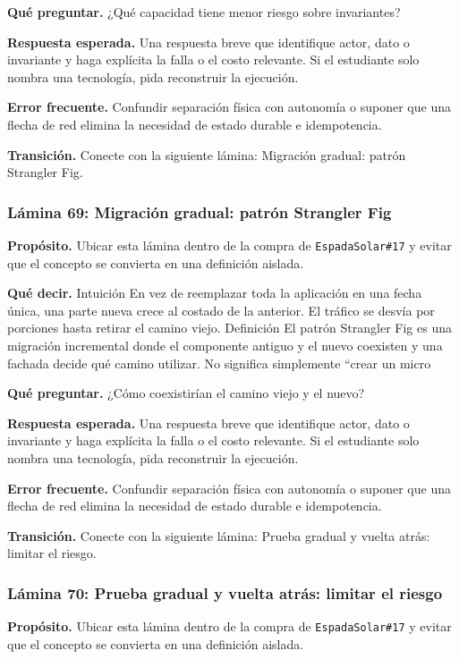 \documentclass[variant=docente,cover=institutional,mode=screen]{ua-engineering-v6-article}
\begin{document}
\textbf{Qué preguntar.} ¿Qué capacidad tiene menor riesgo sobre invariantes?

\textbf{Respuesta esperada.} Una respuesta breve que identifique actor, dato o invariante y haga explícita la falla o el costo relevante. Si el estudiante solo nombra una tecnología, pida reconstruir la ejecución.

\textbf{Error frecuente.} Confundir separación física con autonomía o suponer que una flecha de red elimina la necesidad de estado durable e idempotencia.

\textbf{Transición.} Conecte con la siguiente lámina: Migración gradual: patrón Strangler Fig.

\subsubsection*{Lámina 69: Migración gradual: patrón Strangler Fig}
\textbf{Propósito.} Ubicar esta lámina dentro de la compra de \texttt{EspadaSolar\#17} y evitar que el concepto se convierta en una definición aislada.

\textbf{Qué decir.} Intuición En vez de reemplazar toda la aplicación en una fecha única, una parte nueva crece al costado de la anterior. El tráfico se desvía por porciones hasta retirar el camino viejo. Definición El patrón Strangler Fig es una migración incremental donde el componente antiguo y el nuevo coexisten y una fachada decide qué camino utilizar. No significa simplemente “crear un micro

\textbf{Qué preguntar.} ¿Cómo coexistirían el camino viejo y el nuevo?

\textbf{Respuesta esperada.} Una respuesta breve que identifique actor, dato o invariante y haga explícita la falla o el costo relevante. Si el estudiante solo nombra una tecnología, pida reconstruir la ejecución.

\textbf{Error frecuente.} Confundir separación física con autonomía o suponer que una flecha de red elimina la necesidad de estado durable e idempotencia.

\textbf{Transición.} Conecte con la siguiente lámina: Prueba gradual y vuelta atrás: limitar el riesgo.

\subsubsection*{Lámina 70: Prueba gradual y vuelta atrás: limitar el riesgo}
\textbf{Propósito.} Ubicar esta lámina dentro de la compra de \texttt{EspadaSolar\#17} y evitar que el concepto se convierta en una definición aislada.
\end{document}
